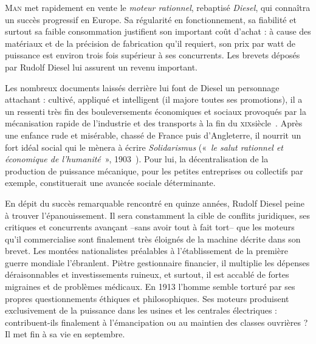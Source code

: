 	\textsc{Man} met rapidement en vente le \textit{moteur rationnel}, rebaptisé \textit{Diesel}, qui connaîtra un succès progressif en Europe. Sa régularité en fonctionnement, sa fiabilité et surtout sa faible consommation justifient son important coût d’achat : à cause des matériaux et de la précision de fabrication qu’il requiert, son prix par watt de puissance est environ trois fois supérieur à ses concurrents. Les brevets déposés par Rudolf Diesel lui assurent un revenu important.
	
	Les nombreux documents laissés derrière lui font de Diesel un personnage attachant : cultivé, appliqué et intelligent (il majore toutes ses promotions), il a un ressenti très fin des bouleversements économiques et sociaux provoqués par la mécanisation rapide de l’industrie et des transports à la fin du \textsc{xix}\ieme siècle~\cite{grosser1978,thomas1978,coltrane1997}. Après une enfance rude et misérable, chassé de France puis d’Angleterre, il nourrit un fort idéal social qui le mènera à écrire \textit{Solidarismus} («~\textit{le salut rationnel et économique de l’humanité}~», 1903~\cite{diesel1903}). Pour lui, la décentralisation de la production de puissance mécanique, pour les petites entreprises ou collectifs par exemple, constituerait une avancée sociale déterminante.
	
	En dépit du succès remarquable rencontré en quinze années, Rudolf Diesel peine à trouver l’épanouissement. Il sera constamment la cible de conflits juridiques, ses critiques et concurrents avançant --sans avoir tout à fait tort-- que les moteurs qu’il commercialise sont finalement très éloignés de la machine décrite dans son brevet. Les montées nationalistes préalables à l’établissement de la première guerre mondiale l’ébranlent. Piètre gestionnaire financier, il multiplie les dépenses déraisonnables et investissements ruineux, et surtout, il est accablé de fortes migraines et de problèmes médicaux. En 1913 l’homme semble torturé par ses propres questionnements éthiques et philosophiques. Ses moteurs produisent exclusivement de la puissance dans les usines et les centrales électriques : contribuent-ils finalement à l’émancipation ou  au maintien des classes ouvrières ? Il met fin à sa vie en septembre.
	
